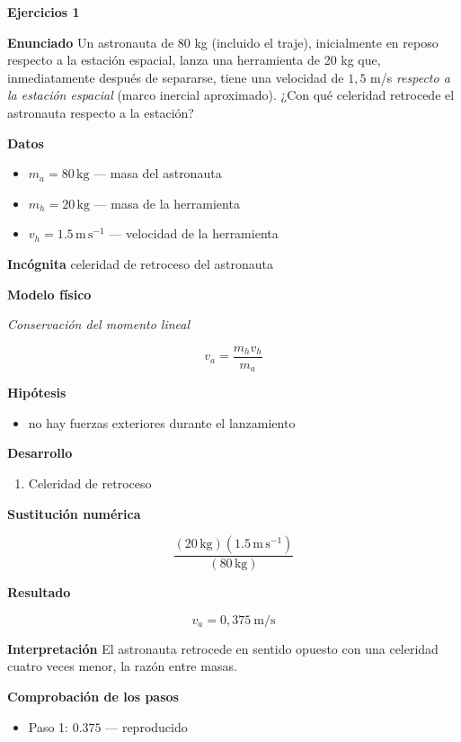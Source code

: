\documentclass[10pt,openany]{book}
\begin{document}
\noindent\textbf{Ejercicios 1}

\noindent\textbf{Enunciado}
Un astronauta de 80 kg (incluido el traje), inicialmente en reposo respecto a la estación espacial, lanza una herramienta de 20 kg que, inmediatamente después de separarse, tiene una velocidad de \(1{,}5\) m/s \emph{respecto a la estación espacial} (marco inercial aproximado). ¿Con qué celeridad retrocede el astronauta respecto a la estación?

\noindent\textbf{Datos}
\begin{itemize}
\item $m_{a} = 80\,\mathrm{kg}$ — masa del astronauta
\item $m_{h} = 20\,\mathrm{kg}$ — masa de la herramienta
\item $v_{h} = 1.5\,\mathrm{m}\,\mathrm{s}^{-1}$ — velocidad de la herramienta
\end{itemize}

\noindent\textbf{Incógnita}
celeridad de retroceso del astronauta

\noindent\textbf{Modelo físico}

\noindent\textit{Conservación del momento lineal}

\[
v_a = \frac{m_h v_h}{m_a}
\]

\noindent\textbf{Hipótesis}
\begin{itemize}
\item no hay fuerzas exteriores durante el lanzamiento
\end{itemize}

\noindent\textbf{Desarrollo}
\begin{enumerate}
\item
Celeridad de retroceso
\end{enumerate}

\noindent\textbf{Sustitución numérica}

\[
\frac{\left(20\,\mathrm{kg}\right) \left(1.5\,\mathrm{m}\,\mathrm{s}^{-1}\right)}{\left(80\,\mathrm{kg}\right)}
\]

\noindent\textbf{Resultado}

\[
v_a = 0{,}375\ \mathrm{m/s}
\]

\noindent\textbf{Interpretación}
El astronauta retrocede en sentido opuesto con una celeridad cuatro veces menor, la razón entre masas.

\noindent\textbf{Comprobación de los pasos}
\begin{itemize}
\item Paso 1: $0.375$ — reproducido
\end{itemize}
\end{document}
